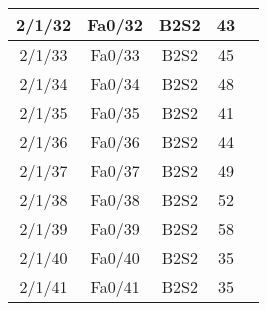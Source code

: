\begin{center}
\begin{longtable}{|c|c|c|c|c|}
	2/1/32 & Fa0/32 & B2S2 & 43 \\ \hline
	2/1/33 & Fa0/33 & B2S2 & 45 \\ \hline
	2/1/34 & Fa0/34 & B2S2 & 48 \\ \hline
	2/1/35 & Fa0/35 & B2S2 & 41 \\ \hline
	2/1/36 & Fa0/36 & B2S2 & 44 \\ \hline
	2/1/37 & Fa0/37 & B2S2 & 49 \\ \hline
	2/1/38 & Fa0/38 & B2S2 & 52 \\ \hline
	2/1/39 & Fa0/39 & B2S2 & 58 \\ \hline
	2/1/40 & Fa0/40 & B2S2 & 35 \\ \hline
	2/1/41 & Fa0/41 & B2S2 & 35 \\ \hline

    \end{longtable}
\end{center}

